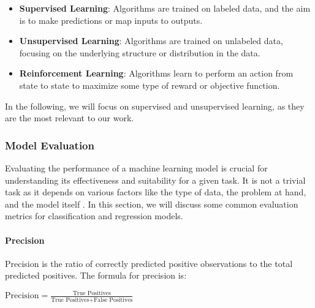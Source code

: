         \begin{itemize}
            \item \textbf{Supervised Learning}: Algorithms are trained on labeled data, and the aim is to make predictions or map inputs to outputs.
            \item \textbf{Unsupervised Learning}: Algorithms are trained on unlabeled data, focusing on the underlying structure or distribution in the data.
            \item \textbf{Reinforcement Learning}: Algorithms learn to perform an action from state to state to maximize some type of reward or objective function.
        \end{itemize}

        In the following, we will focus on supervised and unsupervised learning, as they are the most relevant to our work.

        \subsubsection{Model Evaluation}
        Evaluating the performance of a machine learning model is crucial for understanding its effectiveness and suitability for a given task. It is not a trivial task as it depends on various factors like the type of data, the problem at hand, and the model itself \cite{EvaluatingQualityMLExplanations21}. In this section, we will discuss some common evaluation metrics for classification and regression models.
    
        \begin{minipage}{\dimexpr\linewidth-20pt}
            \paragraph{Precision}
            Precision is the ratio of correctly predicted positive observations to the total predicted positives. The formula for precision is:
            \par
            \vspace{2em}
            \begin{center}
                $
                \text{Precision} = \frac{\text{True Positives}}{\text{True Positives} + \text{False Positives}}
                $
            \end{center}
            \vspace{1em}
        \end{minipage}
    
